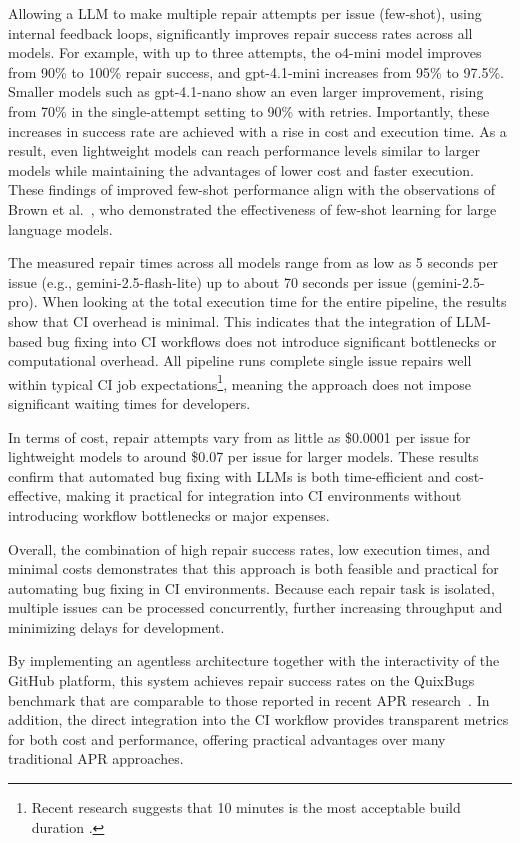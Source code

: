 Allowing a \ac{LLM} to make multiple repair attempts per issue (few-shot), using internal feedback loops, significantly improves repair success rates across all models. For example, with up to three attempts, the o4-mini model improves from 90\% to 100\% repair success, and gpt-4.1-mini increases from 95\% to 97.5\%. Smaller models such as gpt-4.1-nano show an even larger improvement, rising from 70\% in the single-attempt setting to 90\% with retries. Importantly, these increases in success rate are achieved with a rise in cost and execution time. As a result, even lightweight models can reach performance levels similar to larger models while maintaining the advantages of lower cost and faster execution. These findings of improved few-shot performance align with the observations of Brown et al.~\cite{brownLanguageModelsAre2020}, who demonstrated the effectiveness of few-shot learning for large language models.

The measured repair times across all models range from as low as 5 seconds per issue (e.g., gemini-2.5-flash-lite) up to about 70 seconds per issue (gemini-2.5-pro). When looking at the total execution time for the entire pipeline, the results show that \ac{CI} overhead is minimal. This indicates that the integration of LLM-based bug fixing into CI workflows does not introduce significant bottlenecks or computational overhead. All pipeline runs complete single issue repairs well within typical CI job expectations\footnote{Recent research suggests that 10 minutes is the most acceptable build duration \cite{hiltonTradeoffsContinuousIntegration2017}.}, meaning the approach does not impose significant waiting times for developers.

In terms of cost, repair attempts vary from as little as \$0.0001 per issue for lightweight models to around \$0.07 per issue for larger models. These results confirm that automated bug fixing with \acp{LLM} is both time-efficient and cost-effective, making it practical for integration into \ac{CI} environments without introducing workflow bottlenecks or major expenses.

Overall, the combination of high repair success rates, low execution times, and minimal costs demonstrates that this approach is both feasible and practical for automating bug fixing in CI environments. Because each repair task is isolated, multiple issues can be processed concurrently, further increasing throughput and minimizing delays for development.

By implementing an agentless architecture together with the interactivity of the GitHub platform, this system achieves repair success rates on the QuixBugs benchmark that are comparable to those reported in recent APR research~\cite{huCanGPTO1Kill2024, }. In addition, the direct integration into the CI workflow provides transparent metrics for both cost and performance, offering practical advantages over many traditional APR approaches.

